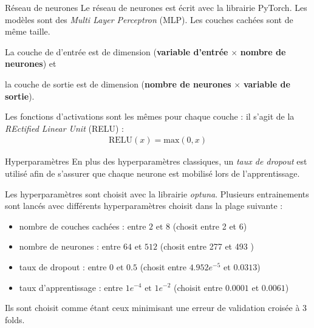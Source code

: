 \documentclass[
11pt,notheorems,hyperref={pdfauthor=whatever}
]{beamer}
\begin{document}
\begin{frame}{Réseau de neurones}
    Le réseau de neurones est écrit avec la librairie PyTorch. Les modèles sont des \textit{Multi Layer Perceptron} (MLP). Les couches cachées sont de même taille. 
    
    \vspace{0.3cm}
    
    La couche de d'entrée est de dimension (\textbf{variable d'entrée }$\times$ \textbf{nombre de neurones}) et 

    la couche de sortie est de dimension (\textbf{nombre de neurones} $\times$  \textbf{variable de sortie}).

    Les fonctions d'activations sont les mêmes pour chaque couche : il s'agit de la \textit{REctified Linear Unit} (RELU) : 
    \begin{align*}
        \text{RELU}(x) = \text{max}(0,x)        
    \end{align*}
\end{frame}

\begin{frame}{Hyperparamètres}
    En plus des hyperparamètres classiques, un \textit{taux de dropout} est utilisé afin de s'assurer que chaque neurone est mobilisé lors de l'apprentissage.
    
    \vspace{0.2cm}

    Les hyperparamètres sont choisit avec la librairie \textit{optuna}. Plusieurs entrainements sont lancés avec différents hyperparamètres choisit dans la plage
    suivante : 
    
    \begin{itemize}
        \item nombre de couches cachées : entre $2 \text{ et } 8$ (chosit entre 2 et 6)
        \item nombre de neurones : entre $64$ et $512$ (chosit entre 277 et 493 )
        \item taux de dropout : entre $0$ et $0.5$ (chosit entre $4.952e^{-5}$ et $0.0313$)
        \item taux d'apprentissage : entre $1e^{-4} \text{ et } 1e^{-2}$ (choisit entre $0.0001$ et $0.0061$)
    \end{itemize}
    
    Ils sont choisit comme étant ceux minimisant une erreur de validation croisée à 3 folds.
\end{frame}
\end{document}
